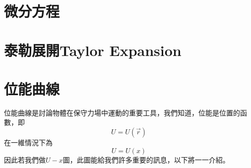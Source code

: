 \documentclass[cn,10pt,math=newtx,chinesefont=founder]{elegantbook}
\begin{document}
\section{微分方程}

\section{泰勒展開Taylor Expansion}

\section{位能曲線}
位能曲線是討論物體在保守力場中運動的重要工具，我們知道，位能是位置的函數，即
\begin{equation}
    U = U(\vec{r})
\end{equation}
在一維情況下為
\begin{equation}
    U = U(x)
\end{equation}
因此若我們做$U-x$圖，此圖能給我們許多重要的訊息，以下將一一介紹。
\end{document}
